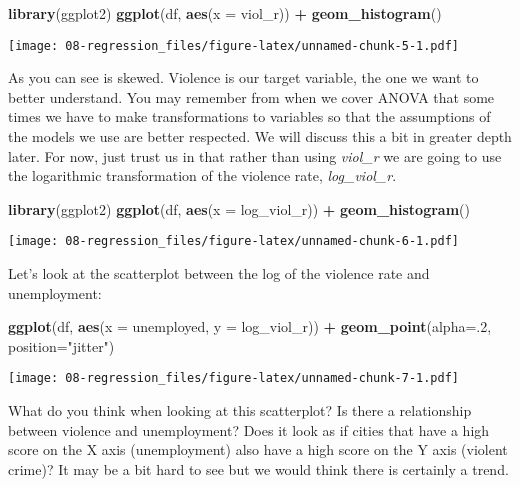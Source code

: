 \documentclass[
]{book}
\newenvironment{Shaded}{\begin{snugshade}}{\end{snugshade}}
\newcommand{\AttributeTok}[1]{\textcolor[rgb]{0.13,0.29,0.53}{#1}}
\newcommand{\DecValTok}[1]{\textcolor[rgb]{0.00,0.00,0.81}{#1}}
\newcommand{\FunctionTok}[1]{\textcolor[rgb]{0.13,0.29,0.53}{\textbf{#1}}}
\newcommand{\NormalTok}[1]{#1}
\newcommand{\SpecialCharTok}[1]{\textcolor[rgb]{0.81,0.36,0.00}{\textbf{#1}}}
\newcommand{\StringTok}[1]{\textcolor[rgb]{0.31,0.60,0.02}{#1}}
\begin{document}
\begin{Shaded}
\begin{Highlighting}[]
\FunctionTok{library}\NormalTok{(ggplot2)}
\FunctionTok{ggplot}\NormalTok{(df, }\FunctionTok{aes}\NormalTok{(}\AttributeTok{x =}\NormalTok{ viol\_r)) }\SpecialCharTok{+}
  \FunctionTok{geom\_histogram}\NormalTok{()}
\end{Highlighting}
\end{Shaded}

\texttt{[image: 08-regression\_files/figure-latex/unnamed-chunk-5-1.pdf]}

As you can see is skewed. Violence is our target variable, the one we want to better understand. You may remember from when we cover ANOVA that some times we have to make transformations to variables so that the assumptions of the models we use are better respected. We will discuss this a bit in greater depth later. For now, just trust us in that rather than using \emph{viol\_r} we are going to use the logarithmic transformation of the violence rate, \emph{log\_viol\_r}.

\begin{Shaded}
\begin{Highlighting}[]
\FunctionTok{library}\NormalTok{(ggplot2)}
\FunctionTok{ggplot}\NormalTok{(df, }\FunctionTok{aes}\NormalTok{(}\AttributeTok{x =}\NormalTok{ log\_viol\_r)) }\SpecialCharTok{+}
  \FunctionTok{geom\_histogram}\NormalTok{()}
\end{Highlighting}
\end{Shaded}

\texttt{[image: 08-regression\_files/figure-latex/unnamed-chunk-6-1.pdf]}

Let's look at the scatterplot between the log of the violence rate and unemployment:

\begin{Shaded}
\begin{Highlighting}[]
\FunctionTok{ggplot}\NormalTok{(df, }\FunctionTok{aes}\NormalTok{(}\AttributeTok{x =}\NormalTok{ unemployed, }\AttributeTok{y =}\NormalTok{ log\_viol\_r)) }\SpecialCharTok{+}
  \FunctionTok{geom\_point}\NormalTok{(}\AttributeTok{alpha=}\NormalTok{.}\DecValTok{2}\NormalTok{, }\AttributeTok{position=}\StringTok{"jitter"}\NormalTok{) }
\end{Highlighting}
\end{Shaded}

\texttt{[image: 08-regression\_files/figure-latex/unnamed-chunk-7-1.pdf]}

What do you think when looking at this scatterplot? Is there a relationship between violence and unemployment? Does it look as if cities that have a high score on the X axis (unemployment) also have a high score on the Y axis (violent crime)? It may be a bit hard to see but we would think there is certainly a trend.
\end{document}
